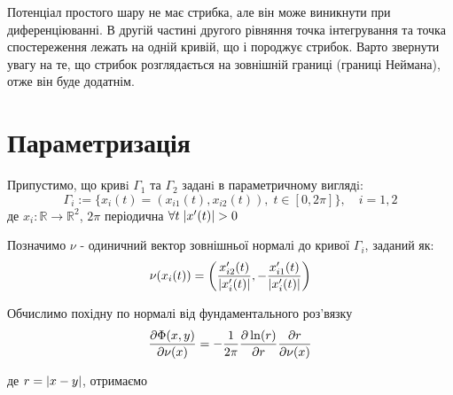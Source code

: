 \documentclass[14pt,a4paper]{extarticle}
\newcounter{e}
\numberwithin{equation}{section}
\newcommand{\intl}{\int\limits}
\begin{document}
 Потенціал простого шару не має стрибка, але він може виникнути при диференціюванні. В другій частині другого рівняння точка інтегрування та точка спостереження лежать на одній кривій, що і породжує стрибок. Варто звернути увагу на те, що стрибок розглядається на зовнішній границі (границі Неймана), отже він буде додатнім.
 

  
 \newpage
 \thispagestyle{empty}
 \section{Параметризація}

 Припустимо, що кривi $\Gamma_{1}$ та $\Gamma_{2}$ заданi в параметричному виглядi:
\begin{equation}
	\label{parametrization}
	 \Gamma_{i} := \{ x_{i}(t) = (x_{i1}(t), x_{i2}(t)), \; t \in [ 0, 2\pi ] \} , \quad i = 1, 2
\end{equation}
\indent де $x_{i} : \mathbb{R} \rightarrow \mathbb{R}^2$, $2\pi$ періодична $\forall{t} \; \abs{x'(t)} > 0$ 

Позначимо $\nu$ - одиничний вектор зовнішньої нормалі до кривої $\Gamma_{i}$, заданий як:
\begin{equation}
	\nu(x_i(t)) = \left(
	\frac{
		x'_{i2}(t)}{\abs{x'_{i}(t)}
	},
	- \frac{
	x'_{i1}(t)}{\abs{x'_{i}(t)}}
	\right)
\end{equation}

Обчислимо похідну по нормалі від фундаментального роз'вязку
$$
\pdv{\Phi(x, y)}{\nu(x)} = -\frac{1}{2\pi} \pdv{\ln(r)}{r}\pdv{r}{\nu(x)}
$$

\indent де $r = \abs{x - y}$, отримаємо
\end{document}
